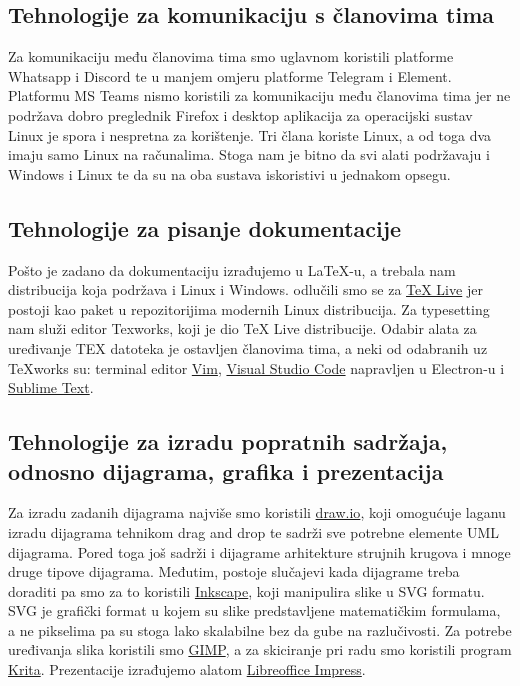 			\subsection{Tehnologije za komunikaciju s članovima tima}
				Za komunikaciju među članovima tima smo uglavnom koristili platforme Whatsapp i Discord te u manjem omjeru platforme Telegram i Element. Platformu MS Teams nismo koristili za komunikaciju među članovima tima jer ne podržava dobro preglednik Firefox i desktop aplikacija za operacijski sustav Linux je spora i nespretna za korištenje. Tri člana koriste Linux, a od toga dva imaju samo Linux na računalima. Stoga nam je bitno da svi alati podržavaju i Windows i Linux te da su na oba sustava iskoristivi u jednakom opsegu.
				
			\subsection{Tehnologije za pisanje dokumentacije}
				Pošto je zadano da dokumentaciju izrađujemo u LaTeX-u, a trebala nam distribucija koja podržava i Linux i Windows. odlučili smo se za \href{https://www.tug.org/texlive/}{TeX Live} jer postoji kao paket u repozitorijima modernih Linux distribucija. Za typesetting nam služi editor Texworks, koji je dio TeX Live distribucije. Odabir alata za uređivanje TEX datoteka je ostavljen članovima tima, a neki od odabranih uz TeXworks su: terminal editor \href{https://www.vim.org/}{Vim}, \href{https://code.visualstudio.com/}{Visual Studio Code} napravljen u Electron-u i \href{https://www.sublimetext.com/}{Sublime Text}.
			
			\subsection{Tehnologije za izradu popratnih sadržaja, odnosno dijagrama, grafika i prezentacija}
				Za izradu zadanih dijagrama najviše smo koristili \href{https://www.drawio.com/}{draw.io}, koji omogućuje laganu izradu dijagrama tehnikom drag and drop te sadrži sve potrebne elemente UML dijagrama. Pored toga još sadrži i dijagrame arhitekture strujnih krugova i mnoge druge tipove dijagrama. Međutim, postoje slučajevi kada dijagrame treba doraditi pa smo za to koristili \href{https://inkscape.org/}{Inkscape}, koji manipulira slike u SVG formatu. SVG je grafički format u kojem su slike predstavljene matematičkim formulama, a ne pikselima pa su stoga lako skalabilne bez da gube na razlučivosti. Za potrebe uređivanja slika koristili smo \href{https://www.gimp.org/}{GIMP}, a za skiciranje pri radu smo koristili program \href{https://krita.org/}{Krita}. Prezentacije izrađujemo alatom \href{https://www.libreoffice.org/}{Libreoffice Impress}.
				
